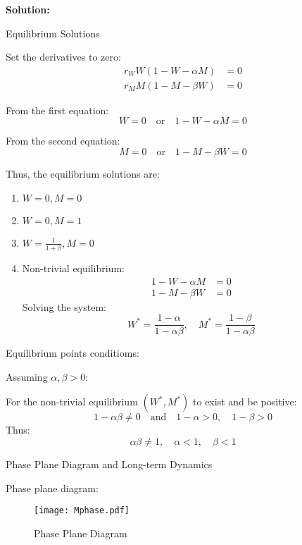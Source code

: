 \documentclass[12pt]{article}
\newenvironment{solution}{
    \textbf{Solution:}
    
}{
    
    \vspace{2em}
}
\begin{document}
\begin{solution}

    Equilibrium Solutions
    
    Set the derivatives to zero:
    \[
    \begin{aligned}
    r_W W(1 - W - \alpha M) &= 0 \\
    r_M M(1 - M - \beta W) &= 0
    \end{aligned}
    \]
    
    From the first equation:
    \[
    W = 0 \quad \text{or} \quad 1 - W - \alpha M = 0
    \]
    
    From the second equation:
    \[
    M = 0 \quad \text{or} \quad 1 - M - \beta W = 0
    \]
    
    Thus, the equilibrium solutions are:
    \begin{enumerate}
        \item \( W = 0, M = 0 \)
        \item \( W = 0, M = 1 \)
        \item \( W = \frac{1}{1 + \beta}, M = 0 \)
        \item Non-trivial equilibrium:
        \[
        \begin{aligned}
        1 - W - \alpha M &= 0 \\
        1 - M - \beta W &= 0
        \end{aligned}
        \]
        Solving the system:
        \[
        W^* = \frac{1 - \alpha}{1 - \alpha \beta}, \quad M^* = \frac{1 - \beta}{1 - \alpha \beta}
        \]
    \end{enumerate}
    
    Equilibrium points conditioms:

    Assuming \(\alpha, \beta > 0\):
    
    For the non-trivial equilibrium \( (W^*, M^*) \) to exist and be positive:
    \[
    1 - \alpha \beta \neq 0 \quad \text{and} \quad 1 - \alpha > 0, \quad 1 - \beta > 0
    \]
    Thus:
    \[
    \alpha \beta \neq 1, \quad \alpha < 1, \quad \beta < 1
    \]
    
    Phase Plane Diagram and Long-term Dynamics
    
    Phase plane diagram:
    \begin{figure}[H]
        \centering
        \texttt{[image: Mphase.pdf]}
        \caption{Phase Plane Diagram}
    \end{figure}
    
\end{solution}
\end{document}
